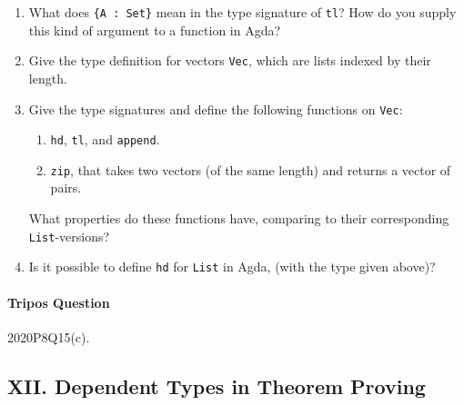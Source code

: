\documentclass[11pt,a4paper,twoside]{article}
\begin{document}
\begin{enumerate}[label=(\alph*)]
  \item What does \texttt{\{A : Set\}} mean in the type signature of \texttt{tl}?
  How do you supply this kind of argument to a function in Agda?

  \item Give the type definition for vectors \texttt{Vec}, 
  which are lists indexed by their length.

  \item Give the type signatures and define the following functions on \texttt{Vec}:
  \begin{enumerate}[label=(\roman*)]
    \item \texttt{hd}, \texttt{tl}, and \texttt{append}.
    \item \texttt{zip}, that takes two vectors (of the same length) and returns a vector of pairs.
  \end{enumerate}
  What properties do these functions have, comparing to their corresponding \texttt{List}-versions?

  \item Is it possible to define \texttt{hd} for \texttt{List} in Agda,
  (with the type given above)?
\end{enumerate}

\paragraph{Tripos Question} 2020P8Q15(c).

\subsection*{XII. Dependent Types in Theorem Proving}


\end{document}
